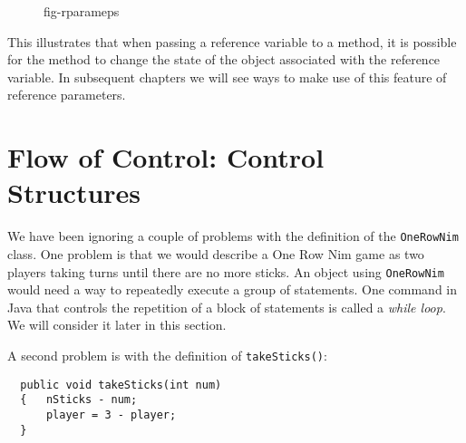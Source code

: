\begin{figure}[tb]
{fig-rparameps}
\end{figure}

\noindent This illustrates that when passing a reference variable
to a method, it is possible for the method to change the state of the
object associated with the reference variable.  In subsequent chapters
we will see ways to make use of this feature of reference parameters.



\section{Flow of Control: Control Structures}

\noindent We have been ignoring a couple of problems with the
definition of the {\tt OneRowNim} class.  One problem is that we would
describe a One Row Nim game as two players taking turns until there
are no more sticks. An object using {\tt OneRowNim} would need a way
to repeatedly execute a group of statements. One command in Java that
controls the repetition of a block of statements is called a {\it
while loop}.  We will consider it later in this section.

A second problem is with the definition of {\tt takeSticks()}:

\begin{jjjlisting}
\begin{lstlisting}
  public void takeSticks(int num)
  {   nSticks - num;
      player = 3 - player;
  }
\end{lstlisting}
\end{jjjlisting}

